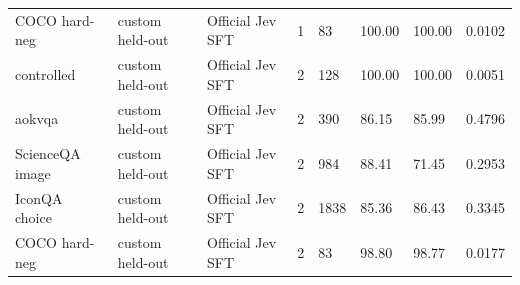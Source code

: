 \begin{table}[t]
{\begin{tabular}{llllllll}
COCO hard-neg & custom held-out & Official Jev SFT & 1 & 83 & 100.00 & 100.00 & 0.0102 \\
controlled & custom held-out & Official Jev SFT & 2 & 128 & 100.00 & 100.00 & 0.0051 \\
aokvqa & custom held-out & Official Jev SFT & 2 & 390 & 86.15 & 85.99 & 0.4796 \\
ScienceQA image & custom held-out & Official Jev SFT & 2 & 984 & 88.41 & 71.45 & 0.2953 \\
IconQA choice & custom held-out & Official Jev SFT & 2 & 1838 & 85.36 & 86.43 & 0.3345 \\
COCO hard-neg & custom held-out & Official Jev SFT & 2 & 83 & 98.80 & 98.77 & 0.0177 \\
\bottomrule
\end{tabular}}
\end{table}
